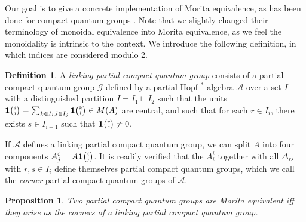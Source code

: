 \documentclass[10pt]{article}
\newcommand{\Grt}[3]{#1{\tiny{\begin{pmatrix} #2\\#3\end{pmatrix}}}}
\newcommand{\UnitC}[2]{\Grt{\mathbf{1}}{#1}{#2}}
\newtheorem{Prop}[Theorem]{Proposition}
\theoremstyle{definition}
\newtheorem{Def}[Theorem]{Definition}
\numberwithin{equation}{section}
\begin{document}
Our goal is to give a concrete implementation of Morita equivalence, as has been done for compact quantum groups \cite{BDV1}. Note that we slightly changed their terminology of monoidal equivalence into Morita equivalence, as we feel the monoidality is intrinsic to the context. We introduce the following definition, in which indices are considered modulo 2. 

\begin{Def} A \emph{linking partial compact quantum group} consists of a partial compact quantum group $\mathscr{G}$ defined by a partial Hopf $^*$-algebra $\mathscr{A}$ over a set $I$ with a distinguished partition $I = I_1\sqcup I_2$ such that the units $\UnitC{i}{j} = \sum_{k\in I_i,l\in I_j} \UnitC{k}{l} \in M(A)$ are central, and such that for each $r\in I_i$, there exists $s\in I_{i+1}$ such that $\UnitC{r}{s}\neq 0$.
\end{Def}

If $\mathscr{A}$ defines a linking partial compact quantum group, we can split $A$ into four components $A^i_j = A\UnitC{i}{j}$. It is readily verified that the $A^i_i$ together with all $\Delta_{rs}$ with $r,s \in I_i$ define themselves partial compact quantum groups, which we call the \emph{corner} partial compact quantum groups of $\mathscr{A}$. 

\begin{Prop} Two partial compact quantum groups are Morita equivalent iff they arise as the corners of a linking partial compact quantum group.
\end{Prop}
\end{document}
